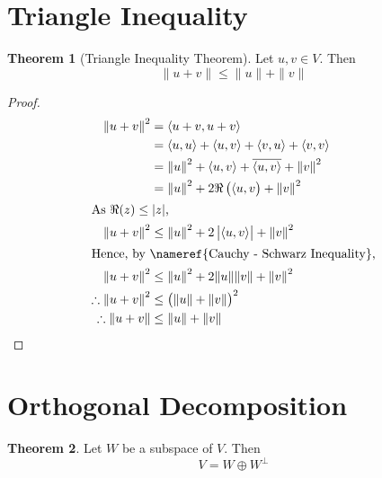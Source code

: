 \documentclass[fleqn, a4paper, 12pt]{article}
\theoremstyle{definition}
\theoremstyle{theorem}
\newtheorem{theorem}{Theorem} %
\theoremstyle{remark}
\numberwithin{corollary}{theorem}
\numberwithin{equation}{theorem}
\begin{document}
\section{Triangle Inequality}

\begin{theorem}[Triangle Inequality Theorem]
	Let $u, v \in V$. Then
	\begin{equation*}
		\| u + v \| \leq \| u \| + \| v \|
	\end{equation*}
\end{theorem}

\begin{proof}
	\begin{align*}
		{\| u + v \|}^2 &= \langle u + v, u + v \rangle\\
		&= \langle u, u \rangle + \langle u, v \rangle + \langle v, u \rangle + \langle v, v \rangle\\
		&= {\| u \|}^2 + \langle u, v \rangle + \overline{\langle u, v \rangle} + {\| v \|}^2\\
		&= {\| u \|}^2 + 2 \Re \left( \langle u, v \right) + {\| v \|}^2\\
		\intertext{As $\Re(z) \leq |z|$,}
		{\| u + v\|}^2 &\leq {\| u \|}^2 + 2 \left\lvert \langle u, v \rangle \right\rvert + {\| v \|}^2\\
		\intertext{Hence, by \nameref{Cauchy - Schwarz Inequality},}
		{\| u + v\|}^2 &\leq {\| u \|}^2 + 2 \| u \| \| v \| + {\| v \|}^2\\
		\therefore {\| u + v\|}^2 & \leq \left( \| u \| + \| v \| \right)^2\\
		\therefore \| u + v\| & \leq \| u \| + \| v \|
	\end{align*}
\end{proof}

\section{Orthogonal Decomposition}

\begin{theorem}
	Let $W$ be a subspace of $V$. Then
	\begin{equation*}
		V = W \oplus W^{\perp}
	\end{equation*}
\end{theorem}
\end{document}
